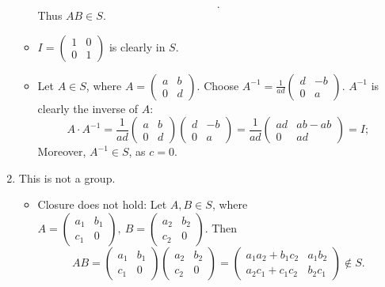 \documentclass{homework}
\begin{document}
\begin{solution}
\begin{enumerate}[label=(\alph*)]
\begin{itemize}
\[          .\] Thus $AB\in S$.
        \item $I=\begin{pmatrix} 1&0\\0&1 \end{pmatrix} $ is clearly in $S$.
        \item Let $A\in S$, where $A=\begin{pmatrix} a&b\\0&d \end{pmatrix} $. Choose
          $A^{-1}=\frac{1}{ad}\begin{pmatrix} d&-b\\0&a \end{pmatrix} $. $A^{-1}$ is clearly the
          inverse of $A$: \[
          A\cdot A^{-1}=\frac{1}{ad}\begin{pmatrix} a&b\\0&d \end{pmatrix} \begin{pmatrix} d&-b\\0&a
          \end{pmatrix} = \frac{1}{ad}\begin{pmatrix} ad&ab-ab\\0&ad \end{pmatrix} =I
          ;\] Moreover, $A^{-1}\in S$, as $c=0$.
      \end{itemize}
    \item This is not a group.
      \begin{itemize}
        \item Closure does not hold: Let $A,B\in S$, where $A=\begin{pmatrix} a_1&b_1\\c_1&0
            \end{pmatrix} ,\ B=\begin{pmatrix} a_2&b_2\\c_2&0 \end{pmatrix} $. Then \[
              AB = \begin{pmatrix} a_1&b_1\\c_1&0\end{pmatrix}\begin{pmatrix} a_2&b_2\\c_2&0
              \end{pmatrix}=\begin{pmatrix} a_1a_2+b_1c_2&a_1b_2\\a_2c_1+c_1c_2&b_2c_1 \end{pmatrix}
              \not\in S
            .\] 

\end{itemize}
\end{enumerate}
\end{solution}
\end{document}
